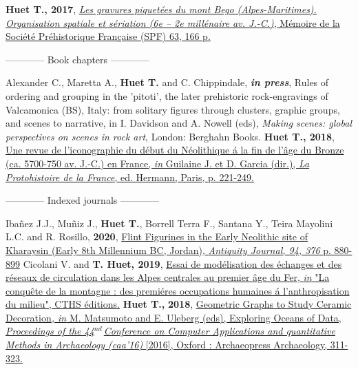 \documentclass[11pt]{report} %
\begin{document}
\textbf{Huet T., 2017}, \href{http://www.prehistoire.org/shop_515-40342-0-0/m63-2017-les-gravures-piquetees-du-mont-bego-alpes-maritimes-organisation-spatiale-et-seriation-vie-iie-millenaire-av.-j.-c.-t.-huet.html}{\textit{Les gravures piquet\'{e}es du mont Bego (Alpes-Maritimes). Organisation spatiale et s\'{e}riation (6e -- 2e mill\'{e}naire av. J.-C.)}, M\'{e}moire de la Soci\'{e}t\'{e} Pr\'{e}historique Fran\c{c}aise (SPF) 63, 166 p.} 
\bigbreak
\begin{center}------------ Book chapters ------------\end{center}
\smallbreak
Alexander C., Maretta A., \textbf{Huet T.} and C. Chippindale, \textit{\textbf{in press}}, Rules of ordering and grouping in the 'pitoti', the later prehistoric rock-engravings of Valcamonica (BS), Italy: from solitary figures through clusters, graphic groups, and scenes to narrative, in I. Davidson and A. Nowell (eds), \textit{Making scenes: global perspectives on scenes in rock art}, London: Berghahn Books.
\smallbreak
\textbf{Huet T., 2018}, \href{https://hal.archives-ouvertes.fr/hal-01983284}{Une revue de l'iconographie du d\'{e}but du N\'{e}olithique \'{a} la fin de l'\^{a}ge du Bronze (ca. 5700-750 av. J.-C.) en France, \textit{in} Guilaine J. et D. Garcia (dir.), \textit{La Protohistoire de la France}, ed. Hermann, Paris, p. 221-249.}
\bigbreak
\begin{center}------------ Indexed journals ------------\end{center}
\smallbreak
Iba\~{n}ez J.J., Mu\~{n}iz J., \textbf{Huet T.}, Borrell Terra F.,  Santana Y., Teira Mayolini L.C. and R. Rosillo, \textbf{2020}, \href{https://www.cambridge.org/core/services/aop-cambridge-core/content/view/FFEB57291718AF9FF216F1113844C61B/S0003598X20000782a.pdf/div-class-title-flint-figurines-from-the-early-neolithic-site-of-kharaysin-jordan-div.pdf}{Flint Figurines in the Early Neolithic site of Kharaysin (Early 8th Millennium BC, Jordan), \textit{Antiquity Journal, 94, 376} p. 880-899}
\smallbreak
Cicolani V. and \textbf{T. Huet, 2019}, \href{https://halshs.archives-ouvertes.fr/halshs-02314978/document}{Essai de mod\'{e}lisation des \'{e}changes et des r\'{e}seaux de circulation dans les Alpes centrales au premier \^{a}ge du Fer, \textit{in} "La conqu\^{e}te de la montagne : des premi\'{e}res occupations humaines \'{a} l'anthropisation du milieu", CTHS \'{e}ditions.}
\smallbreak
\textbf{Huet T.,} \textbf{2018}, \href{http://archaeopress.com/ArchaeopressShop/Public/displayProductDetail.asp?id=\%7B2724F16C-FAC1-4987-8D1E-E85D9F94ACAD\%7D}{Geometric Graphs to Study Ceramic Decoration\textit{, in} M. Matsumoto and  E. Uleberg (eds), Exploring Oceans of Data, \textit{Proceedings of the 44${}^{nd\ }$Conference on Computer Applications and quantitative Methods in Archaeology (caa'16) }[2016], Oxford : Archaeopress Archaeology, 311-323.}
\end{document}
